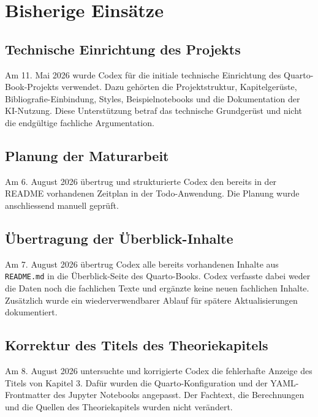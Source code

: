 \documentclass[
  ngerman,
  a4paper,
  DIV=11,
  oneside]{scrreprt}
\begin{document}
\section{Bisherige Einsätze}\label{bisherige-einsuxe4tze}

\subsection{Technische Einrichtung des
Projekts}\label{technische-einrichtung-des-projekts}

Am 11. Mai 2026 wurde Codex für die initiale technische Einrichtung des
Quarto-Book-Projekts verwendet. Dazu gehörten die Projektstruktur,
Kapitelgerüste, Bibliografie-Einbindung, Styles, Beispielnotebooks und
die Dokumentation der KI-Nutzung. Diese Unterstützung betraf das
technische Grundgerüst und nicht die endgültige fachliche Argumentation.

\subsection{Planung der Maturarbeit}\label{planung-der-maturarbeit}

Am 6. August 2026 übertrug und strukturierte Codex den bereits in der
README vorhandenen Zeitplan in der Todo-Anwendung. Die Planung wurde
anschliessend manuell geprüft.

\subsection{Übertragung der
Überblick-Inhalte}\label{uxfcbertragung-der-uxfcberblick-inhalte}

Am 7. August 2026 übertrug Codex alle bereits vorhandenen Inhalte aus
\texttt{README.md} in die Überblick-Seite des Quarto-Books. Codex
verfasste dabei weder die Daten noch die fachlichen Texte und ergänzte
keine neuen fachlichen Inhalte. Zusätzlich wurde ein wiederverwendbarer
Ablauf für spätere Aktualisierungen dokumentiert.

\subsection{Korrektur des Titels des
Theoriekapitels}\label{korrektur-des-titels-des-theoriekapitels}

Am 8. August 2026 untersuchte und korrigierte Codex die fehlerhafte
Anzeige des Titels von Kapitel 3. Dafür wurden die Quarto-Konfiguration
und der YAML-Frontmatter des Jupyter Notebooks angepasst. Der Fachtext,
die Berechnungen und die Quellen des Theoriekapitels wurden nicht
verändert.
\end{document}
